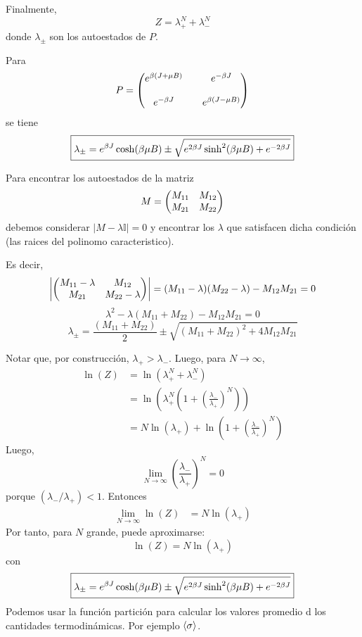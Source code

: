Finalmente,
\begin{equation}
\boxed{  Z=\lambda_+^N+\lambda_-^N}
\end{equation}
donde $\lambda_{\pm }$ son los autoestados de $P$.

Para 
\begin{equation}
  P= \mqty(e^{\b(J+\m B)}&&e^{-\b J}\\\\
  e^{-\b J}&& e^{\b (J-\m B)})
\end{equation}
se tiene
\begin{equation}
 \boxed{ \lambda_{\pm }=e^{\beta J}\cosh (\beta\mu B)\pm\sqrt{e^{2\beta J}\sinh^2(\beta\mu B)+e^{-2\beta J}}}
\end{equation}

Para encontrar los autoestados de la matriz
\begin{equation}
 M=\mqty(M_{11}&M_{12}\\M_{21}&M_{22})
\end{equation}
debemos considerar $|M-\lambda\mathbb{I}|=0$ y encontrar los $\lambda$ que satisfacen dicha condición (las raices del polinomo caracteristico).

Es decir,
\begin{equation}
  \left|\mqty(M_{11}-\lambda&M_{12}\\M_{21}&M_{22}-\lambda)\right|=(M_{11}-\lambda)(M_{22}-\lambda)-M_{12}M_{21}=0
\end{equation}
\begin{equation}
  \lambda^2-\lambda(M_{11}+M_{22})-M_{12}M_{21}=0
\end{equation}
\begin{equation}
\boxed{  \lambda_{\pm }=\frac{(M_{11}+M_{22})}{2}\pm \sqrt{(M_{11}+M_{22})^2+4M_{12}M_{21}}}
\end{equation}

Notar que, por construcción, $\lambda_+>\lambda_-$. Luego, para $N\to \infty$,
\begin{align}
  \ln(Z)&=\ln(\lambda_+^N+\lambda_-^N)\\
  &=\ln\left(\lambda_+^N\left(1+\left(\frac{\lambda_-}{\lambda_+}\right)^N\right)\right)\\
  &=N\ln(\lambda_+)+\ln\left(1+\left(\frac{\lambda_-}{\lambda_+}\right)^N\right)
\end{align}
Luego,
\begin{equation}
  \lim_{N\to \infty}\left(\frac{\lambda_-}{\lambda_+}\right)^N=0
\end{equation}
porque $(\lambda_-/\lambda_+)<1$. Entonces
\begin{align}
  \lim_{N\to \infty}\ln(Z)&=N\ln(\lambda_+)
\end{align}
Por tanto, para $N$ grande, puede aproximarse:
\begin{equation}
\boxed{  \ln(Z)=N\ln(\lambda_+)}
\end{equation}
con
\begin{equation}
 \boxed{ \lambda_{\pm }=e^{\beta J}\cosh (\beta\mu B)\pm\sqrt{e^{2\beta J}\sinh^2(\beta\mu B)+e^{-2\beta J}}}
\end{equation}
Podemos usar la función partición para calcular los valores promedio d los cantidades termodinámicas. Por ejemplo $\ev{\s}$.

